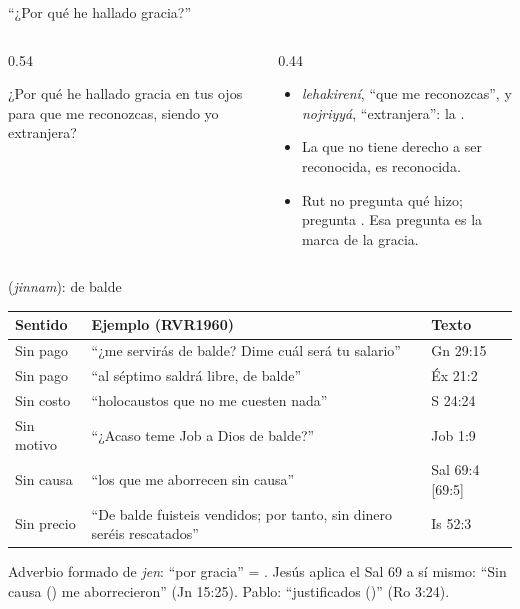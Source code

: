 \begin{frame}{``¿Por qué he hallado gracia?''}
\begin{columns}[c,onlytextwidth]
\begin{column}{0.54\textwidth}
\centering{}
\begin{cita}¿Por qué he hallado gracia en tus ojos para que me reconozcas, siendo yo extranjera?\end{cita}
\end{column}
\begin{column}{0.44\textwidth}\small\RaggedRight
\begin{itemize}
\item {} \emph{lehakirení}, ``que me reconozcas'', y  \emph{nojriyyá}, ``extranjera'': la  .
\item La que no tiene derecho a ser reconocida, es reconocida.
\item Rut no pregunta qué hizo; pregunta . Esa pregunta es la marca de la gracia.
\end{itemize}
\end{column}
\end{columns}
\end{frame}

\begin{frame}{ (\emph{jinnam}): de balde}
\scriptsize\renewcommand{\arraystretch}{1.15}
\begin{tabular}{@{}>{\RaggedRight\arraybackslash}p{2.0cm}>{\RaggedRight\arraybackslash}p{7.2cm}>{\RaggedRight\arraybackslash}p{2.4cm}@{}}
\toprule
\textbf{Sentido} & \textbf{Ejemplo (RVR1960)} & \textbf{Texto} \\ \midrule
Sin pago & ``¿me servirás de balde? Dime cuál será tu salario'' & Gn 29:15 \\
Sin pago & ``al séptimo saldrá libre, de balde'' & Éx 21:2 \\
Sin costo & ``holocaustos que no me cuesten nada'' & 2 S 24:24 \\
Sin motivo & ``¿Acaso teme Job a Dios de balde?'' & Job 1:9 \\
Sin causa & ``los que me aborrecen sin causa'' & Sal 69:4 [69:5] \\
Sin precio & ``De balde fuisteis vendidos; por tanto, sin dinero seréis rescatados'' & Is 52:3 \\
\bottomrule
\end{tabular}\par\medskip
\small Adverbio formado de \emph{jen}: ``por gracia'' = . Jesús aplica el Sal 69 a sí mismo: ``Sin causa () me aborrecieron'' (Jn 15:25). Pablo: ``justificados  ()'' (Ro 3:24).\par\smallskip
{}
\end{frame}

